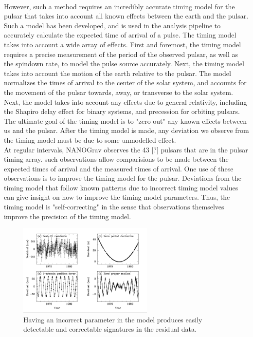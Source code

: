 \documentclass[12pt]{article}
\begin{document}
\\
However, such a method requires an incredibly accurate timing model for the
pulsar that takes into account all known effects between the earth and the
pulsar. Such a model has been developed, and is used in the analysis pipeline to
accurately calculate the expected time of arrival of a pulse. The timing model
takes into account a wide array of effects. First and foremost, the timing model
requires a precise measurement of the period of the observed pulsar, as well as
the spindown rate, to model the pulse source accurately. Next, the timing model
takes into account the motion of the earth relative to the pulsar. The model
normalizes the times of arrival to the center of the solar system, and accounts
for the movement of the pulsar towards, away, or transverse to the solar system.
Next, the model takes into account any effects due to general relativity,
including the Shapiro delay effect for binary systems, and precession for
orbiting pulsars.
The ultimate goal of the timing model is to "zero out" any known effects between
us and the pulsar. After the timing model is made, any deviation we observe from
the timing model must be due to some unmodelled effect.
\\
At regular intervals, NANOGrav observes the 43 [?] pulsars that are in the
pulsar timing array. such observations allow comparisions to be made between the
expected times of arrival and the measured times of arrival. One use of these
observations is to improve the timing model for the pulsar. Deviations from the
timing model that follow known patterns due to incorrect timing model values can
give insight on how to improve the timing model parameters.
Thus, the timing model is "self-correcting" in the sense that
observations themselves improve the precision of the timing model.

\begin{figure}
\caption{Having an incorrect parameter in the model produces easily detectable
and correctable signatures in the residual data.}
\includegraphics[width=0.6\textwidth]{./figures/bad_timing.png}
\end{figure}
\end{document}
